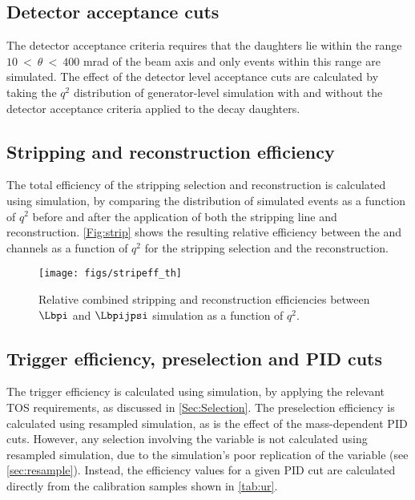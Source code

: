 \subsection{Detector acceptance cuts}
The detector acceptance criteria requires that the daughters lie within the range $10~<~\theta~<~400$ mrad of the beam axis and only events within this range are simulated.  The effect of the detector level acceptance cuts are calculated by taking the $q^{2}$ distribution of generator-level simulation with and without the detector acceptance criteria applied to the decay daughters. 



\subsection{Stripping and reconstruction efficiency}\label{Sec:stripeff}
The total efficiency of the stripping selection and reconstruction is calculated using \Lbpi simulation, by comparing the distribution of simulated events as a function of $q^{2}$ before and after the application of both the stripping line and reconstruction. \autoref{Fig:strip} shows the resulting relative efficiency between the \Lbpi and \Lbpijpsi channels as a function of $q^{2}$ for the stripping selection and the reconstruction.
\begin{figure}[h]
  \centering
  \texttt{[image: figs/stripeff\_th]}%
  \caption{Relative combined stripping and reconstruction efficiencies between $\Lbpi$ and $\Lbpijpsi$ simulation as a function of $q^{2}$.}
  \label{Fig:strip}
\end{figure}


\subsection{Trigger efficiency, preselection and PID cuts}
The trigger efficiency is calculated using simulation, by applying the relevant TOS requirements, as discussed in \autoref{Sec:Selection}. The preselection efficiency is calculated using resampled simulation, as is the effect of the mass-dependent PID cuts. However, any selection involving the \dllpk variable is not calculated using resampled simulation, due to the simulation's poor replication of the \dllpk variable (see \autoref{sec:resample}). Instead, the efficiency values for a given PID cut are calculated directly from the calibration samples shown in \autoref{tab:ur}.

